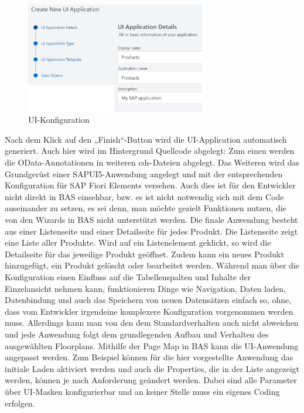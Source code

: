\begin{figure}[htbp]
 \centering
 \includegraphics[width=0.7\textwidth]{Bilder/fiori_element/3_7_UI_Konfiguration.jpg}
 \caption{UI-Konfiguration}
\end{figure}

Nach dem Klick auf den „Finish“-Button wird die UI-Application automatisch generiert. Auch hier wird im Hintergrund Quellcode abgelegt: Zum einen werden die OData-Annotationen in weiteren cds-Dateien abgelegt. Das Weiteren wird das Grundgerüst einer SAPUI5-Anwendung angelegt und mit der entsprechenden Konfiguration für SAP Fiori Elements versehen. Auch dies ist für den Entwickler nicht direkt in BAS einsehbar, bzw. es ist nicht notwendig sich mit dem Code auseinander zu setzen, es sei denn, man möchte gezielt Funktionen nutzen, die von den Wizards in BAS nicht unterstützt werden.
Die finale Anwendung besteht aus einer Listenseite und einer Detailseite für jedes Produkt. Die Listenseite zeigt eine Liste aller Produkte. Wird auf ein Listenelement geklickt, so wird die Detailseite für das jeweilige Produkt geöffnet. Zudem kann ein neues Produkt hinzugefügt, ein Produkt gelöscht oder bearbeitet werden.  Während man über die Konfiguration einen Einfluss auf die Tabellenspalten und Inhalte der Einzelansicht nehmen kann, funktionieren Dinge wie Navigation, Daten laden, Datenbindung und auch das Speichern von neuen Datensätzen einfach so, ohne, dass vom Entwickler irgendeine komplexere Konfiguration vorgenommen werden muss. Allerdings kann man von den dem Standardverhalten auch nicht abweichen und jede Anwendung folgt dem grundlegenden Aufbau und Verhalten des ausgewählten Floorplans.
Mithilfe der Page Map in BAS kann die UI-Anwendung angepasst werden. Zum Beispiel können für die hier vorgestellte Anwendung das initiale Laden aktiviert werden und auch die Properties, die in der Liste angezeigt werden, können je nach Anforderung geändert werden. Dabei sind alle Parameter über UI-Masken konfigurierbar und an keiner Stelle muss ein eigenes Coding erfolgen.


